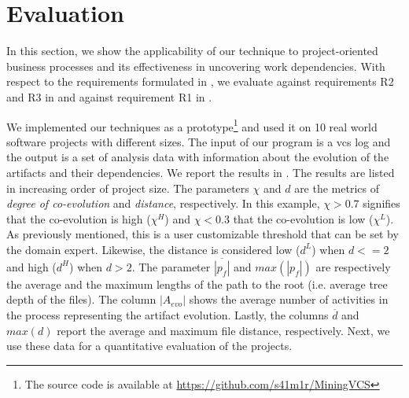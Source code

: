 \section{Evaluation}
\label{sec:evaluation}

In this section, we show the applicability of our technique to project-oriented business processes and its effectiveness in uncovering work dependencies. With respect to the requirements formulated in , we evaluate against requirements {R2} and {R3} in  and against requirement {R1} in .

We implemented our techniques as a prototype\footnote{The source code is available at \url{https://github.com/s41m1r/MiningVCS}} and used it on 10 real world software projects with different sizes. The input of our program is a \gls{vcs} log and the output is a set of analysis data with information about the evolution of the artifacts and their dependencies. We report the results in . The results are listed in increasing order of project size. The parameters $\chi$ and $d$ are the metrics of \emph{degree of co-evolution} and \emph{distance}, respectively. In this example, $\chi > 0.7$ signifies that the co-evolution is high ($\chi^{H}$) and $\chi < 0.3$ that the co-evolution is low ($\chi^{L}$). As previously mentioned, this is a user customizable threshold that can be set by the domain expert. Likewise, the distance is considered low ($d^{L}$) when $d<=2$ and high ($d^{H}$) when $d>2$. The parameter  $\overline{|p_f|}$ and {$max(|p_{f}|)$} are respectively the average and the maximum lengths of the path to the root (i.e. average tree depth of the files). The column {$|A_{evo}|$} shows the average number of activities in the process representing the artifact evolution. Lastly, the columns {$\overline{d}$} and {$max(d)$} report the average and maximum file distance, respectively. Next, we use these data for a quantitative evaluation of the projects.



%




%

